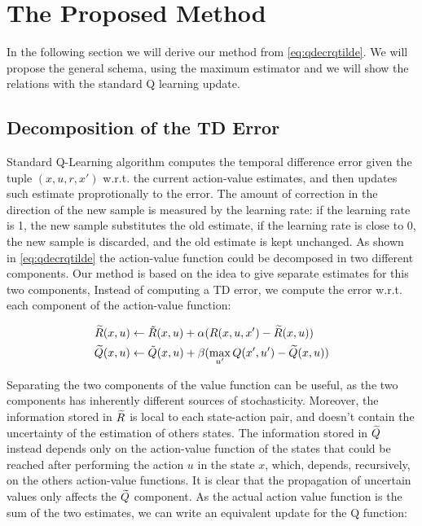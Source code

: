 \documentclass[conference]{IEEEtran}
\begin{document}
\section{The Proposed Method}

In the following section we will derive our method from \ref{eq:qdecrqtilde}. We will propose the general schema, using the maximum estimator and we will show the relations with the standard Q learning update.

\subsection{Decomposition of the TD Error}

Standard Q-Learning algorithm computes the temporal difference error given the tuple $(x,u,r,x')$ w.r.t. the current action-value estimates, and then updates such estimate proprotionally to the error. The amount of correction in the direction of the new sample is measured by the learning rate: if the learning rate is 1, the new sample substitutes the old estimate, if the learning rate is close to 0, the new sample is discarded, and the old estimate is kept unchanged. 
As shown in \ref{eq:qdecrqtilde} the action-value function could be decomposed in two different components. Our method is based on the idea to give separate estimates for this two components,
Instead of computing a TD error, we compute the error w.r.t. each component of the action-value function:

\begin{align}
\Rtilde(x,u) & \leftarrow\tilde{R}(x,u)+\alpha(R(x,u,x')-\Rtilde(x,u)) \label{eq:rtilupdedate}\\
\Qtilde(x,u) & \leftarrow\tilde{Q}(x,u)+\beta(\max_{u'}Q(x',u')-\Qtilde(x,u))
\label{eq:qtildeupdate}
\end{align}

Separating the two components of the value function can be useful, as the two components has inherently different sources of stochasticity. Moreover, the information stored in $\widetilde{R}$ is local to each state-action pair, and doesn't contain the uncertainty of the estimation of others states. The information stored in $\widetilde{Q}$ instead depends only on the action-value function of the states that could be reached after performing the action $u$ in the state $x$, which, depends, recursively, on the others action-value functions. It is clear that the propagation of uncertain values only affects the $\widetilde{Q}$ component.
As the actual action value function is the sum of the two estimates, we can write an equivalent update for the Q function:
\end{document}
